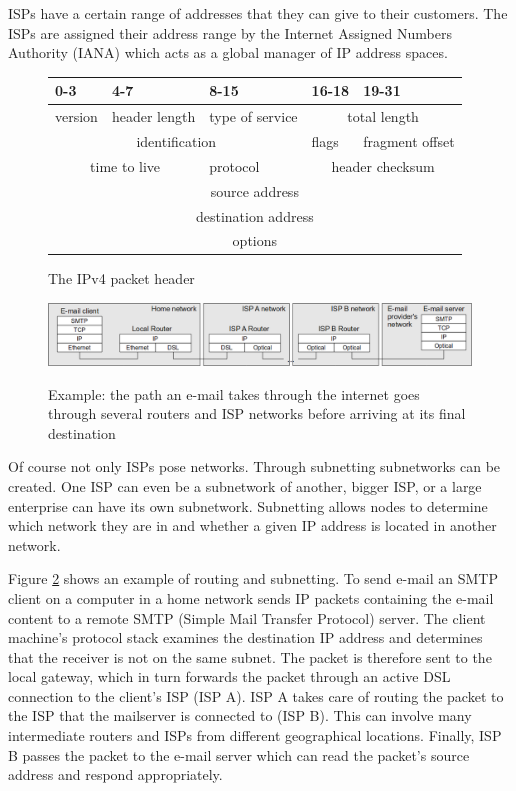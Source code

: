 \documentclass[11pt,twoside,abstract,notitlepage]{scrreprt}
\begin{document}
ISPs have a certain range of addresses that they can give to their customers. The ISPs are assigned their address range by the Internet Assigned Numbers Authority (IANA) which acts as a global manager of IP address spaces.

\begin{figure}
\small
\renewcommand{\arraystretch}{1.2}
\caption{The IPv4 packet header}
\label{ipheader}
\centering
\begin{tabularx}{\textwidth}{|X|X|X|X|X|}
\hline
0-3 & 4-7 & 8-15 & 16-18 & 19-31 \\ \hline
version & header length & type of service & \multicolumn{2}{c|}{total length} \\ \hline
\multicolumn{3}{|c|}{identification} & flags & fragment offset \\ \hline
\multicolumn{2}{|c|}{time to live} & protocol & \multicolumn{2}{c|}{header checksum} \\ \hline
\multicolumn{5}{|c|}{source address} \\ \hline
\multicolumn{5}{|c|}{destination address} \\ \hline
\multicolumn{5}{|c|}{options} \\ \hline
\end{tabularx}
\end{figure}

\begin{figure}
\normalsize
\caption{Example: the path an e-mail takes through the internet goes through several routers and ISP networks before arriving at its final destination}
\centerline{\includegraphics[width=1.0\textwidth]{images/routing.png}
\label{fig:routing}}
\end{figure}

Of course not only ISPs pose networks. Through subnetting subnetworks can be created. One ISP can even be a subnetwork of another, bigger ISP, or a large enterprise can have its own subnetwork. Subnetting allows nodes to determine which network they are in and whether a given IP address is located in another network. 

Figure \ref{fig:routing} shows an example of routing and subnetting. To send e-mail an SMTP client on a computer in a home network sends IP packets containing the e-mail content to a remote SMTP (Simple Mail Transfer Protocol) server. The client machine's protocol stack examines the destination IP address and determines that the receiver is not on the same subnet. The packet is therefore sent to the local gateway, which in turn forwards the packet through an active DSL connection to the client's ISP (ISP A). ISP A takes care of routing the packet to the ISP that the mailserver is connected to (ISP B). This can involve many intermediate routers and ISPs from different geographical locations. Finally, ISP B passes the packet to the e-mail server which can read the packet's source address and respond appropriately.
\end{document}
